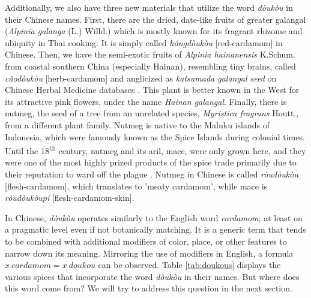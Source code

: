 \documentclass[12pt]{article}
\begin{document}
Additionally, we also have three new materials that utilize the word \textit{dòukòu} in their Chinese names. First, there are the dried, date-like fruits of greater galangal (\textit{Alpinia galanga} (L.) Willd.) which is mostly known for its fragrant rhizome and ubiquity in Thai cooking. It is simply called \textit{hóngdòukòu} [red-cardamom] in Chinese. Then, we have the semi-exotic fruits of \textit{Alpinia hainanensis} K.Schum. from coastal southern China (especially Hainan), resembling tiny brains, called \textit{cǎodòukòu} [herb-cardamom] and anglicized as \textit{katsumada galangal seed} on Chinese Herbal Medicine databases \parencite[cf.][]{polyu_2022_chinese}. This plant is better known in the West for its attractive pink flowers, under the name \textit{Hainan galangal}.  Finally, there is nutmeg, the seed of a tree from an unrelated species, \textit{Myristica fragrans} Houtt., from a different plant family. Nutmeg is native to the Maluku islands of Indonesia, which were famously known as the Spice Islands during colonial times. Until the 18\textsuperscript{th} century, nutmeg and its aril, mace, were only grown here, and they were one of the most highly prized products of the spice trade primarily due to their reputation to ward off the plague \parencite[see][]{milton_1999_nathaniel}. Nutmeg in Chinese is called \textit{ròudòukòu} [flesh-cardamom], which translates to 'meaty cardamom', while mace is \textit{ròudòukòupí}	[flesh-cardamom-skin].


In Chinese, \textit{dòukòu} operates similarly to the English word \textit{cardamom}; at least on a pragmatic level even if not botanically matching. It is a generic term that tends to be combined with additional modifiers of color, place, or other features to narrow down its meaning. Mirroring the use of modifiers in English, a formula $x~cardamom = x~doukou$ can be observed. Table \ref{tab:doukous} displays the various spices that incorporate the word \textit{dòukòu} in their names. But where does this word come from? We will try to address this question in the next section.


\end{document}
